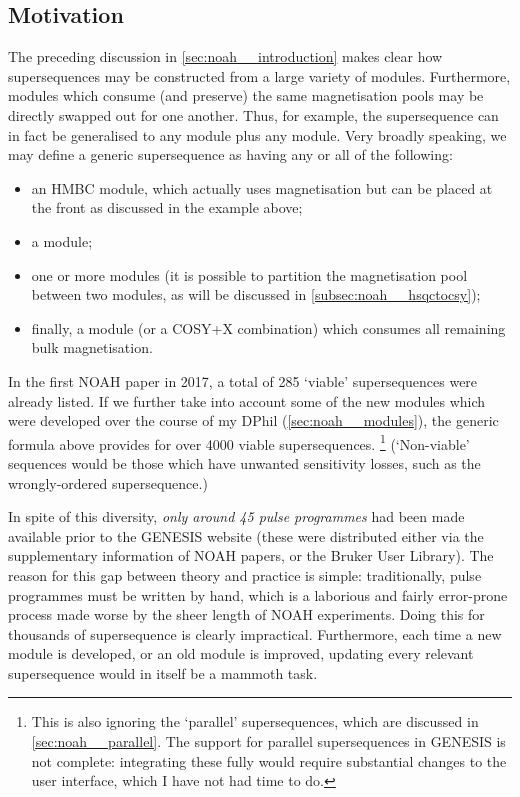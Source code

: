 \subsection{Motivation}
\label{subsec:noah__genesis_motivation}

The preceding discussion in \cref{sec:noah__introduction} makes clear how supersequences may be constructed from a large variety of modules.
Furthermore, modules which consume (and preserve) the same magnetisation pools may be directly swapped out for one another.
Thus, for example, the  supersequence can in fact be generalised to any  module plus any  module.
Very broadly speaking, we may define a generic supersequence as having any or all of the following:

\begin{itemize}
    \item an HMBC module, which actually uses  magnetisation but can be placed at the front as discussed in the  example above;
    \item a  module;
    \item one or more  modules (it is possible to partition the  magnetisation pool between two modules, as will be discussed in \cref{subsec:noah__hsqctocsy});
    \item finally, a  module (or a COSY+X combination) which consumes all remaining bulk magnetisation.
\end{itemize}

In the first NOAH paper in 2017\autocite{Kupce2017ACIE}, a total of 285 `viable' supersequences were already listed.
If we further take into account some of the new modules which were developed over the course of my DPhil (\cref{sec:noah__modules}), the generic formula above provides for over 4000 viable supersequences.%
\footnote{This is also ignoring the `parallel' supersequences, which are discussed in \cref{sec:noah__parallel}. The support for parallel supersequences in GENESIS is not complete: integrating these fully would require substantial changes to the user interface, which I have not had time to do.}
(`Non-viable' sequences would be those which have unwanted sensitivity losses, such as the wrongly-ordered  supersequence.)

In spite of this diversity, \textit{only around 45 pulse programmes} had been made available prior to the GENESIS website (these were distributed either via the supplementary information of NOAH papers, or the Bruker User Library).
The reason for this gap between theory and practice is simple: traditionally, pulse programmes must be written by hand, which is a laborious and fairly error-prone process made worse by the sheer length of NOAH experiments.
Doing this for thousands of supersequence is clearly impractical.
Furthermore, each time a new module is developed, or an old module is improved, updating every relevant supersequence would in itself be a mammoth task.

